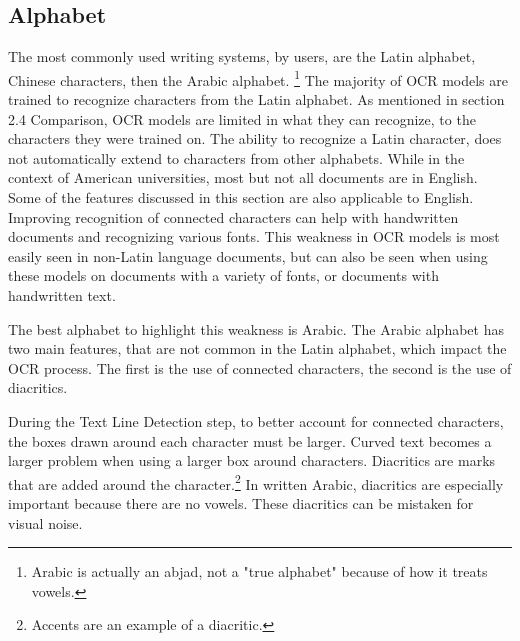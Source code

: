 \documentclass[sigplan,screen,nonacm]{acmart-tagged}
\begin{document}
\subsection{Alphabet}
\label{Alphabet}
The most commonly used writing systems, by users, are the Latin alphabet, Chinese characters, then the Arabic alphabet.\cite{Vaughan:2025} \footnote{Arabic is actually an abjad, not a "true alphabet" because of how it treats vowels.}
The majority of OCR models are trained to recognize characters from the Latin alphabet.
As mentioned in section 2.4 Comparison, OCR models are limited in what they can recognize, to the characters they were trained on.
The ability to recognize a Latin character, does not automatically extend to characters from other alphabets. While in the context of American universities, most but not all documents are in English. Some of the features discussed in this section are also applicable to English. Improving recognition of connected characters can help with handwritten documents and recognizing various fonts. This weakness in OCR models is most easily seen in non-Latin language documents, but can also be seen when using these models on documents with a variety of fonts, or documents with handwritten text.

The best alphabet to highlight this weakness is Arabic.
The Arabic alphabet has two main features, that are not common in the Latin alphabet, which impact the OCR process. The first is the use of connected characters, the second is the use of diacritics. 

During the Text Line Detection step, to better account for connected characters, the boxes drawn around each character must be larger. Curved text becomes a larger problem when using a larger box around characters.\citep{Fateh:2024}
Diacritics are marks that are added around the character.\footnote{Accents are an example of a diacritic.} In written Arabic, diacritics are especially important because there are no vowels. These diacritics can be mistaken for visual noise.

\end{document}
